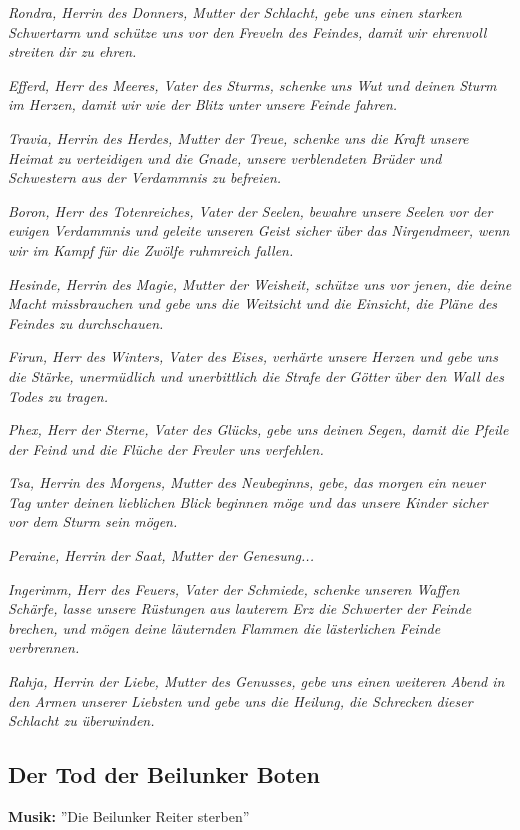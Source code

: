 \emph{Rondra, Herrin des Donners, Mutter der Schlacht, gebe uns einen starken Schwertarm und schütze uns vor den Freveln des Feindes, damit wir ehrenvoll streiten dir zu ehren.}

\emph{Efferd, Herr des Meeres, Vater des Sturms, schenke uns Wut und deinen Sturm im Herzen, damit wir wie der Blitz unter unsere Feinde fahren.}

\emph{Travia, Herrin des Herdes, Mutter der Treue, schenke uns die Kraft unsere Heimat zu verteidigen und die Gnade, unsere verblendeten Brüder und Schwestern aus der Verdammnis zu befreien.}

\emph{Boron, Herr des Totenreiches, Vater der Seelen, bewahre unsere Seelen vor der ewigen Verdammnis und geleite unseren Geist sicher über das Nirgendmeer, wenn wir im Kampf für die Zwölfe ruhmreich fallen.}

\emph{Hesinde, Herrin des Magie, Mutter der Weisheit, schütze uns vor jenen, die deine Macht missbrauchen und gebe uns die Weitsicht und die Einsicht, die Pläne des Feindes zu durchschauen.}

\emph{Firun, Herr des Winters, Vater des Eises, verhärte unsere Herzen und gebe uns die Stärke, unermüdlich und unerbittlich die Strafe der Götter über den Wall des Todes zu tragen.}

\emph{Phex, Herr der Sterne, Vater des Glücks, gebe uns deinen Segen, damit die Pfeile der Feind und die Flüche der Frevler uns verfehlen.}

\emph{Tsa, Herrin des Morgens, Mutter des Neubeginns, gebe, das morgen ein neuer Tag unter deinen lieblichen Blick beginnen möge und das unsere Kinder sicher vor dem Sturm sein mögen.}

\emph{Peraine, Herrin der Saat, Mutter der Genesung...}

\emph{Ingerimm, Herr des Feuers, Vater der Schmiede, schenke unseren Waffen Schärfe, lasse unsere Rüstungen aus lauterem Erz die Schwerter der Feinde brechen, und mögen deine läuternden Flammen die lästerlichen Feinde verbrennen.}

\emph{Rahja, Herrin der Liebe, Mutter des Genusses, gebe uns einen weiteren Abend in den Armen unserer Liebsten und gebe uns die Heilung, die Schrecken dieser Schlacht zu überwinden.}


\subsection{Der Tod der Beilunker Boten}
\textbf{Musik:} ''Die Beilunker Reiter sterben''

